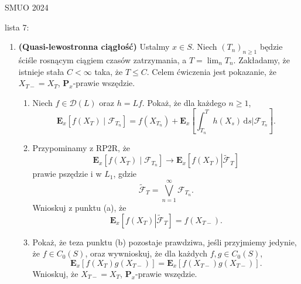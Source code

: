 \documentclass{article}
\begin{document}
SMUO 2024

lista 7: 

\begin{enumerate}
	\item \textbf{(Quasi-lewostronna ciągłość)} 
		Ustalmy \( x \in S \). Niech \( (T_n)_{n \geq 1} \) 
		będzie ściśle rosnącym ciągiem czasów zatrzymania, a \( T = \lim_{n} T_n \). 
		Zakładamy, że istnieje stała \( C < \infty \) taka, że \( T \leq C \). 
		Celem ćwiczenia jest pokazanie, że \( X_{T-} = X_T \), 
		\( \mathbf{P}_x \)-prawie wszędzie.

		\begin{enumerate}
    			\item Niech \( f \in \mathcal{D}(L) \) oraz \( h = Lf \). 
				Pokaż, że dla każdego \( n \geq 1 \),
    				\[
    					\mathbf{E}_x \left[ f(X_T) \mid \mathcal{F}_{T_n} \right] 
					= f(X_{T_n}) + 
					\mathbf{E}_x \left[ \int_{T_n}^T h(X_s) \, \mathrm{d}s \Big| 
					\mathcal{F}_{T_n} \right].
    				\]
    			\item Przypominamy z RP2R, że
    				\[
    					\mathbf{E}_x \left[ f(X_T) \mid \mathcal{F}_{T_n} \right] 
					\to \mathbf{E}_x \left[ f(X_T) \left|
					\widetilde{\mathcal{F}}_T \right]\right.
    				\]
    				prawie pszędzie i w $L_1$, gdzie
    				\[
    					\widetilde{\mathcal{F}}_T = 
					\bigvee_{n=1}^{\infty} \mathcal{F}_{T_n}.
    				\]
    				Wnioskuj z punktu (a), że
    				\[
    					\mathbf{E}_x \left[ f(X_T) \left| 
					\widetilde{\mathcal{F}}_T \right]\right. = f(X_{T-}).
    				\]  
    			\item Pokaż, że teza punktu (b) pozostaje prawdziwa, 
				jeśli przyjmiemy jedynie, że \( f \in C_0(S) \), 
				oraz wywnioskuj, że dla każdych \( f, g \in C_0(S) \),
				\[
    					\mathbf{E}_x \left[ f(X_T) g(X_{T-}) \right] 
					= \mathbf{E}_x \left[ f(X_{T-}) g(X_{T-}) \right].
				\]
    				Wnioskuj, że \( X_{T-} = X_T \), \( \mathbf{P}_x \)-prawie wszędzie.
		\end{enumerate}



\end{enumerate}
\end{document}
